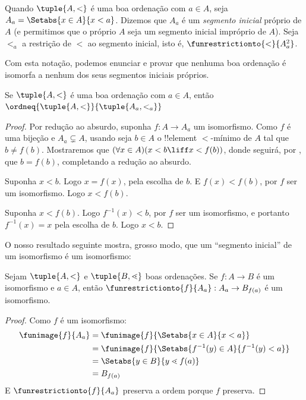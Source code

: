\documentclass[../../../include/open-logic-section]{subfiles}
\begin{document}
\begin{defn}
Quando $\tuple{A, <}$ é uma boa ordenação com $a \in A$, seja $A_a = \Setabs{x \in A}{x
< a}$. Dizemos que $A_a$ é um \emph{segmento inicial} próprio de $A$ (e permitimos que o próprio $A$ seja um segmento inicial impróprio de $A$). Seja
$<_a$ a restrição de $<$ ao segmento inicial, isto é,
$\funrestrictionto{\mathord{<}}{A_a^2}$. 
\end{defn}
\noindent
Com esta notação, podemos enunciar e provar que nenhuma boa ordenação é
isomorfa a nenhum dos seus segmentos iniciais próprios.

\begin{lem}
Se $\tuple{A, <}$ é uma boa ordenação com $a \in A$, então
$\ordneq{\tuple{A, <}}{\tuple{A_a, <_a}}$ 
\end{lem}

\begin{proof}
Por redução ao absurdo, suponha $f \colon A \to A_a$ um isomorfismo. Como
$f$ é uma bijeção e $A_a \subsetneq A$, usando  seja $b \in A$ o
!!{element} $<$-mínimo de $A$ tal que $b \neq f(b)$. Mostraremos que
$(\forall x \in A)(x<b \liff x < f(b))$, donde seguirá, por
, que $b =
f(b)$, completando a redução ao absurdo.

Suponha $x < b$. Logo $x = f(x)$, pela escolha de $b$. E $f(x) <
f(b)$, por $f$ ser um isomorfismo. Logo $x < f(b)$.

Suponha $x < f(b)$. Logo $f^{-1}(x) < b$, por $f$ ser um isomorfismo,
e portanto $f^{-1}(x) = x$ pela escolha de $b$. Logo $x < b$. 
\end{proof}

O nosso resultado seguinte mostra, grosso modo, que um ``segmento inicial'' de um
isomorfismo é um isomorfismo:

\begin{lem}
Sejam $\tuple{A, <}$ e $\tuple{B, \lessdot}$ boas ordenações. Se $f
\colon A \to B$ é um isomorfismo e $a \in A$, então
$\funrestrictionto{f}{A_{a}} : A_a \to B_{f(a)}$ é um isomorfismo.
\end{lem}

\begin{proof}
Como $f$ é um isomorfismo:
\begin{align*}
	\funimage{f}{A_a} &= \funimage{f}{\Setabs{x \in A}{x < a}}\\
	&= \funimage{f}{\Setabs{f^{-1}(y) \in A}{f^{-1}(y) < a}} \\
	&= \Setabs{y \in B}{y \lessdot f(a)} \\
	&=B_{f(a)} 
\end{align*}
E $\funrestrictionto{f}{A_a}$ preserva a ordem porque $f$ preserva. 
\end{proof}
\end{document}
